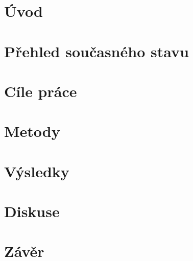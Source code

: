 \documentclass[a4paper,12pt]{article}   %
\numberwithin{equation}{section}        %
\begin{document}
	
	
	\section{Úvod}
	
	\clearpage
	
	\section{Přehled současného stavu}
	
	\clearpage
	
      \section{Cíle práce}
	
	\clearpage
	
	\section{Metody}
	
	\clearpage
	
	\section{Výsledky}
	
	\clearpage
	
	\section{Diskuse}
	
	\clearpage
	
	\section{Závěr}
	
	\clearpage

    \clearpage	
    \renewcommand{\refname}{Seznam použité literatury} 	%
    \printbibliography
    \clearpage

  
    
\end{document}
